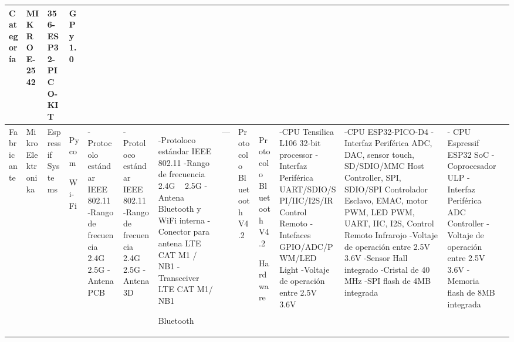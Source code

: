 \begin{longtable}{|M{2.2cm}|M{4.0cm}|M{4.0cm}|M{4.0cm}|}
	\hline
	\textbf{Categoría} & \textbf{MIKROE-2542} & \textbf{356-ESP32-PICO-KIT} & \textbf{GPy 1.0} \\ \hline
	
 	Fabricante & MikroElektronika & Espressif Systems & Pycom
 	\hline
 	 
    Wi-Fi 
    &
    \newline  -Protocolo estándar IEEE 802.11
    \newline  -Rango de frecuencia 2.4G ~ 2.5G 
    \newline  -Antena PCB
	& 
    \newline  -Protoloco estándar IEEE 802.11
    \newline  -Rango de frecuencia 2.4G ~ 2.5G 
    \newline  -Antena 3D
	&   	    
    \newline  -Protoloco estándar IEEE 802.11
    \newline  -Rango de frecuencia 2.4G ~ 2.5G 
    \newline  -Antena Bluetooth y WiFi interna
    \newline  -Conector para antena LTE CAT M1 / NB1
    \newline  -Transceiver LTE CAT M1/ NB1 	
    \hline

	Bluetooth 
    &
	---
    &
	\newline Protocolo Bluetooth V4.2
	&
	\newline Protocolo Bluetooth V4.2 
	\hline
	
	Hardware &
    \newline  -CPU Tensilica L106 32-bit processor
    \newline  -Interfaz Periférica UART/SDIO/SPI/IIC/I2S/IR Control Remoto
    \newline  -Intefaces GPIO/ADC/PWM/LED Light
    \newline  -Voltaje de operación entre 2.5V ~ 3.6V
    &
    \newline  -CPU ESP32-PICO-D4
    \newline  -Interfaz Periférica ADC, DAC, sensor touch, SD/SDIO/MMC Host Controller, SPI, SDIO/SPI Controlador Esclavo, EMAC, motor PWM, LED PWM, UART, IIC, I2S, Control Remoto Infrarojo 
    \newline  -Voltaje de operación entre 2.5V ~ 3.6V
    \newline  -Sensor Hall integrado
    \newline  -Cristal de 40 MHz
    \newline  -SPI flash de 4MB integrada
    &
    \newline  - CPU Espressif ESP32 SoC
    \newline  - Coprocesador ULP
    \newline  - Interfaz Periférica ADC Controller
    \newline  - Voltaje de operación entre 2.5V ~ 3.6V
    \newline  - Memoria flash de 8MB integrada
    &
	\hline
	

\end{longtable}
